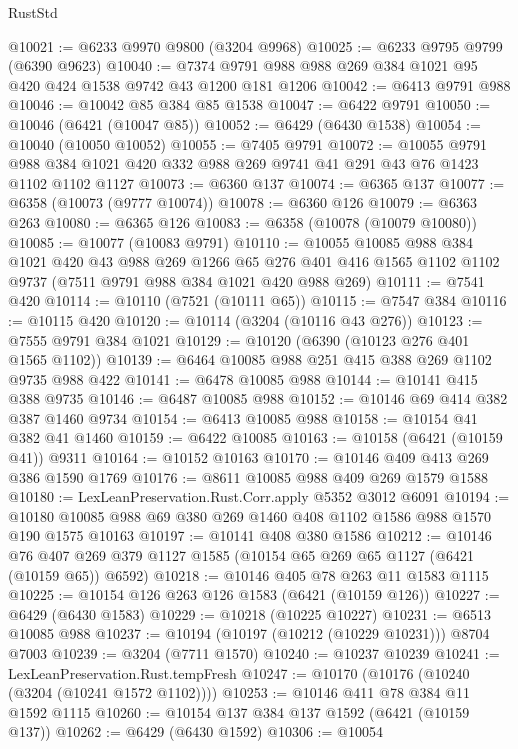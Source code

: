 \begin{lexlean}{RustStd}
\begin{coremodule}
@10021 := @6233 @9970 @9800 (@3204 @9968)
@10025 := @6233 @9795 @9799 (@6390 @9623)
@10040 := @7374 @9791 @988 @988 @269 @384 @1021 @95 @420 @424 @1538 @9742 @43 @1200 @181 @1206
@10042 := @6413 @9791 @988
@10046 := @10042 @85 @384 @85 @1538
@10047 := @6422 @9791
@10050 := @10046 (@6421 (@10047 @85))
@10052 := @6429 (@6430 @1538)
@10054 := @10040 (@10050 @10052)
@10055 := @7405 @9791
@10072 := @10055
    @9791
    @988
    @384
    @1021
    @420
    @332
    @988
    @269
    @9741
    @41
    @291
    @43
    @76
    @1423
    @1102
    @1102
    @1127
@10073 := @6360 @137
@10074 := @6365 @137
@10077 := @6358 (@10073 (@9777 @10074))
@10078 := @6360 @126
@10079 := @6363 @263
@10080 := @6365 @126
@10083 := @6358 (@10078 (@10079 @10080))
@10085 := @10077 (@10083 @9791)
@10110 := @10055
    @10085
    @988
    @384
    @1021
    @420
    @43
    @988
    @269
    @1266
    @65
    @276
    @401
    @416
    @1565
    @1102
    @1102
    @9737
    (@7511 @9791 @988 @384 @1021 @420 @988 @269)
@10111 := @7541 @420
@10114 := @10110 (@7521 (@10111 @65))
@10115 := @7547 @384
@10116 := @10115 @420
@10120 := @10114 (@3204 (@10116 @43 @276))
@10123 := @7555 @9791 @384 @1021
@10129 := @10120 (@6390 (@10123 @276 @401 @1565 @1102))
@10139 := @6464 @10085 @988 @251 @415 @388 @269 @1102 @9735 @988 @422
@10141 := @6478 @10085 @988
@10144 := @10141 @415 @388 @9735
@10146 := @6487 @10085 @988
@10152 := @10146 @69 @414 @382 @387 @1460 @9734
@10154 := @6413 @10085 @988
@10158 := @10154 @41 @382 @41 @1460
@10159 := @6422 @10085
@10163 := @10158 (@6421 (@10159 @41)) @9311
@10164 := @10152 @10163
@10170 := @10146 @409 @413 @269 @386 @1590 @1769
@10176 := @8611 @10085 @988 @409 @269 @1579 @1588
@10180 := LexLeanPreservation.Rust.Corr.apply @5352 @3012 @6091
@10194 := @10180 @10085 @988 @69 @380 @269 @1460 @408 @1102 @1586 @988 @1570 @190 @1575 @10163
@10197 := @10141 @408 @380 @1586
@10212 := @10146
    @76
    @407
    @269
    @379
    @1127
    @1585
    (@10154 @65 @269 @65 @1127 (@6421 (@10159 @65)) @6592)
@10218 := @10146 @405 @78 @263 @11 @1583 @1115
@10225 := @10154 @126 @263 @126 @1583 (@6421 (@10159 @126))
@10227 := @6429 (@6430 @1583)
@10229 := @10218 (@10225 @10227)
@10231 := @6513 @10085 @988
@10237 := @10194 (@10197 (@10212 (@10229 @10231))) @8704 @7003
@10239 := @3204 (@7711 @1570)
@10240 := @10237 @10239
@10241 := LexLeanPreservation.Rust.tempFresh
@10247 := @10170 (@10176 (@10240 (@3204 (@10241 @1572 @1102))))
@10253 := @10146 @411 @78 @384 @11 @1592 @1115
@10260 := @10154 @137 @384 @137 @1592 (@6421 (@10159 @137))
@10262 := @6429 (@6430 @1592)
@10306 := @10054

\end{coremodule}
\end{lexlean}
